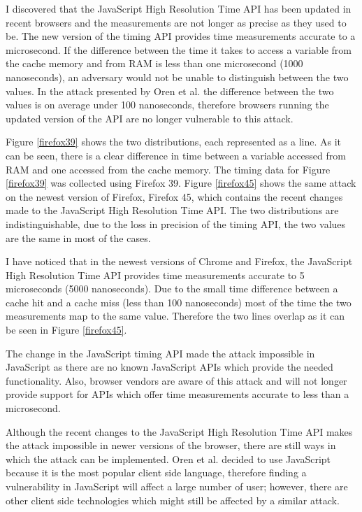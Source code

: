 \documentclass[10pt,a4paper,twoside]{book}
\begin{document}
I discovered that the JavaScript High Resolution Time API has been updated in recent browsers and the measurements are not longer as precise as they used to be. The new version of the timing API provides time measurements accurate to a microsecond. If the difference between the time it takes to access a variable from the cache memory and from RAM is less than one microsecond (1000 nanoseconds), an adversary would not be unable to distinguish between the two values. In the attack presented by Oren et al. the difference between the two values is on average under 100 nanoseconds, therefore browsers running the updated version of the API are no longer vulnerable to this attack. 

Figure \ref{firefox39} shows the two distributions, each represented as a line. As it can be seen, there is a clear difference in time between a variable accessed from RAM and one accessed from the cache memory. The timing data for Figure \ref{firefox39} was collected using Firefox 39. Figure \ref{firefox45} shows the same attack on the newest version of Firefox, Firefox 45, which contains the recent changes made to the JavaScript High Resolution Time API. The two distributions are indistinguishable, due to the loss in precision of the timing API, the two values are the same in most of the cases.

I have noticed that in the newest versions of Chrome and Firefox, the JavaScript High Resolution Time API provides time measurements accurate to 5 microseconds (5000 nanoseconds). Due to the small time difference between a cache hit and a cache miss (less than 100 nanoseconds) most of the time the two measurements map to the same value. Therefore the two lines overlap as it can be seen in Figure \ref{firefox45}.
 
The change in the JavaScript timing API made the attack impossible in JavaScript as there are no known JavaScript APIs which provide the needed functionality. Also, browser vendors are aware of this attack and will not longer provide support for APIs which offer time measurements accurate to less than a microsecond. 

Although the recent changes to the JavaScript High Resolution Time API makes the attack impossible in newer versions of the browser, there are still ways in which the attack can be implemented. Oren et al. decided to use JavaScript because it is the most popular client side language, therefore finding a vulnerability in JavaScript will affect a large number of user; however, there are other client side technologies which might still be affected by a similar attack. 
\end{document}
